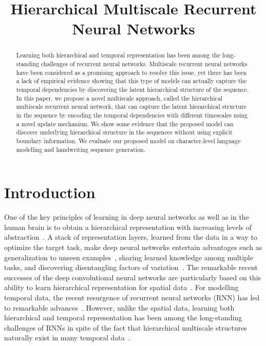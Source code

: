 \title{Hierarchical Multiscale Recurrent Neural Networks}

\begin{abstract}
Learning both hierarchical and temporal representation has been among the long-standing challenges of recurrent neural networks. Multiscale recurrent neural networks have been considered as a promising approach to resolve this issue, yet there has been a lack of empirical evidence showing that this type of models can actually capture the temporal dependencies by discovering the latent hierarchical structure of the sequence. In this paper, we propose a novel multiscale approach, called the hierarchical multiscale recurrent neural network, that can capture the latent hierarchical structure in the sequence by encoding the temporal dependencies with different timescales using a novel update mechanism. We show some evidence that the proposed model can discover underlying hierarchical structure in the sequences without using explicit boundary information. We evaluate our proposed model on character-level language modelling and handwriting sequence generation.
\end{abstract}

\section{Introduction}
\label{sec:introduction}
One of the key principles of learning in deep neural networks as well as in the human brain is to obtain a hierarchical representation with increasing levels of abstraction~\citep{bengio2009learning,lecun2015deep,schmidhuber2015deep}. A stack of representation layers, learned from the data in a way to optimize the target task, make deep neural networks entertain advantages such as generalization to unseen examples~\citep{hoffman2013one}, sharing learned knowledge among multiple tasks, and discovering disentangling factors of variation~\citep{kingma2013auto}. The remarkable recent successes of the deep convolutional neural networks are particularly based on this ability to learn hierarchical representation for spatial data~\citep{krizhevsky2012imagenet}. For modelling temporal data, the recent resurgence of recurrent neural networks (RNN) has led to remarkable advances~\citep{mikolov2010recurrent,graves2013generating,Cho-et-al-EMNLP2014,sutskever2014sequence,vinyals2015show}. However, unlike the spatial data, learning both hierarchical and temporal representation has been among the long-standing challenges of RNNs in spite of the fact that hierarchical multiscale structures naturally exist in many temporal data~\citep{schmidhuber1991neural,mozer1993induction,el1995hierarchical,lin1996learning,koutnik2014clockwork}. 

